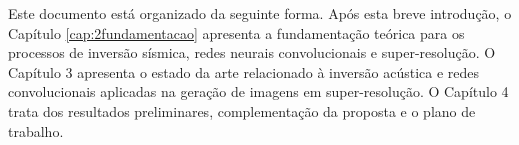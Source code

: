 Este documento está organizado da seguinte forma. Após esta breve introdução, o
Capítulo \ref{cap:2fundamentacao} apresenta a fundamentação teórica para os
processos de inversão sísmica, redes neurais 
convolucionais e super-resolução. O Capítulo 3 %
apresenta o estado da arte relacionado à inversão acústica  e
redes convolucionais aplicadas na geração de imagens em super-resolução. 
O Capítulo 4 %
trata dos resultados preliminares, complementação da proposta e o plano de trabalho.
